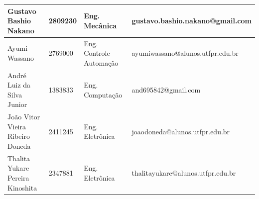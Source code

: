 \documentclass[12pt, a4paper]{article}
\begin{document}
\begin{table}[htbp]
{\begin{tabular}{|l|l|l|l|}
Gustavo Bashio Nakano                              & 2809230                                         & Eng. Mecânica                                      & gustavo.bashio.nakano@gmail.com                    \\ \hline
Ayumi Wassano                                      & 2769000                                         & Eng. Controle Automação                            & ayumiwassano@alunos.utfpr.edu.br                   \\ \hline
André Luiz da Silva Junior                         & 1383833                                         & Eng. Computação                                    & and695842@gmail.com                                \\ \hline
João Vitor Vieira Ribeiro Doneda                   & 2411245                                         & Eng. Eletrônica                                    & joaodoneda@alunos.utfpr.edu.br                     \\ \hline
Thalita Yukare Pereira Kinoshita                   & 2347881                                         & Eng. Eletrônica                                    & thalitayukare@alunos.utfpr.edu.br                  \\ \hline
\end{tabular}%
}
\end{table}
\end{document}
